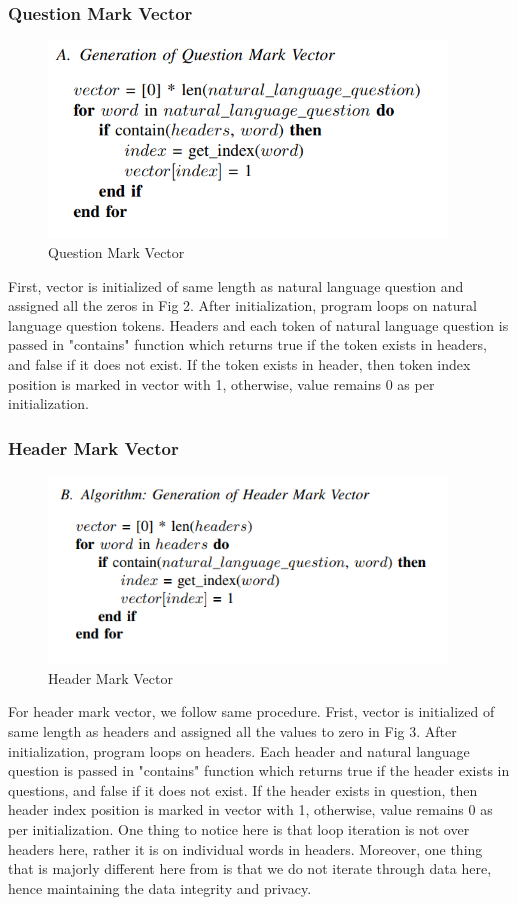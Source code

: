 \documentclass[12pt]{article}
\begin{document}
\subsubsection{Question Mark Vector}
\begin{figure}[H]
    \includegraphics[width=300pt]{QMV}
    \caption{Question Mark Vector}
    \label{fig:Question mark vector}
\end{figure}

First, vector is initialized of same length as natural language question and assigned all the zeros in Fig 2. After initialization, program loops on natural language question tokens. Headers and each token of natural language question is passed in "contains" function which returns true if the token exists in headers, and false if it does not exist. If the token exists in header, then token index position is marked in vector with 1, otherwise, value remains 0 as per initialization. 


\subsubsection{Header Mark Vector}
\begin{figure}[H]
    \includegraphics[width=300pt]{HMV}
    \caption{Header Mark Vector}
    \label{fig:Header mark vector}
\end{figure}

For header mark vector, we follow same procedure. Frist, vector is initialized of same length as headers and assigned all the values to zero in Fig 3. After initialization, program loops on headers. Each header and natural language question is passed in "contains" function which returns true if the header exists in questions, and false if it does not exist. If the header exists in question, then header index position is marked in vector with 1, otherwise, value remains 0 as per initialization. One thing to notice here is that loop iteration is not over headers here, rather it is on individual words in headers. Moreover, one thing that is majorly different here from \cite{guo2019content} is that we do not iterate through data here, hence maintaining the data integrity and privacy.
\\ \\
\end{document}
